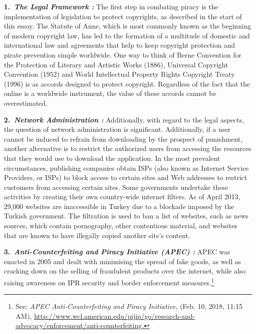 \begin{multicols}{2}
\noi
{\large \bfseries 1.~\textit{The Legal Framework :}} The first step in combating piracy is the implementation of
legislation to protect copyrights, as described in the start of this essay. The Statute of
Anne, which is most commonly known as the beginning of modern copyright law, has
led to the formation of a multitude of domestic and international law and agreements
that help to keep copyright protection and pirate prevention simple worldwide. One
way to think of Berne Convention for the Protection of Literary and Artistic Works
(1886), Universal Copyright Convention (1952) and World Intellectual Property
Rights Copyright Treaty (1996) is as accords designed to protect copyright.
Regardless of the fact that the online is a worldwide instrument, the value of these
accords cannot be overestimated.

\noi
{\large \bfseries 2.~\textit{Network Administration :}} Additionally, with regard to the legal aspects, the question
of network administration is significant. Additionally, if a user cannot be induced to
refrain from downloading by the prospect of punishment, another alternative is to
restrict the authorized users from accessing the resources that they would use to
download the application. In the most prevalent circumstances, publishing companies
obtain ISPs (also known as Internet Service Providers, or ISPs) to block access to 
certain sites and Web addresses to restrict customers from accessing certain sites.
Some governments undertake these activities by creating their own country-wide
internet filters. As of April 2013, 29,000 websites are inaccessible in Turkey due to a
blockade imposed by the Turkish government. The filtration is used to ban a list of
websites, such as news sources, which contain pornography, other contentious
material, and websites that are known to have illegally copied another site's content.

\vspace{-.15cm}

\noi
{\large \bfseries 3.~\textit{Anti-Counterfeiting and Piracy Initiative (APEC) :}} APEC was enacted in 2005 and
dealt with minimising the spread of fake goods, as well as cracking down on the
selling of fraudulent products over the internet, while also raising awareness on IPR
security and border enforcement measures.\footnote{See; \textit{APEC Anti-Counterfeiting and Piracy Initiative,} (Feb. 10, 2018, 11:15 AM), \url{http://www.wcl.american.edu/pijip/go/research-and-advocacy/enforcement/anti-counterfeiting.}}

\vspace{-.15cm}


\end{multicols}
